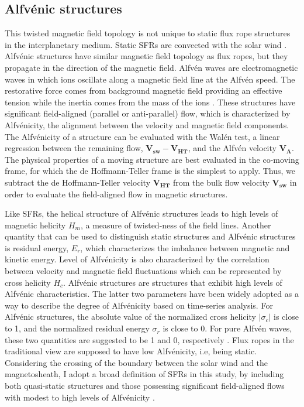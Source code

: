 \subsection{Alfv\'enic structures}
This twisted magnetic field topology is not unique to static flux rope structures in the interplanetary medium. Static SFRs are convected with the solar wind \citep{Cartwright:2008}. Alfv\'enic structures have similar magnetic field topology as flux ropes, but they propagate in the direction of the magnetic field. Alfv\'en waves are electromagnetic waves in which ions oscillate along a magnetic field line at the Alfv\'en speed. The restorative force comes from background magnetic field providing an effective tension while the inertia comes from the mass of the ions \citep{Alfven:1942}. These structures have significant field-aligned (parallel or anti-parallel) flow, which is characterized by Alfv\'enicity, the alignment between the velocity and magnetic field components. The Alfv\'enicity of a structure can be evaluated with the Wal\'en test, a linear regression between the remaining flow, $\mathbf{V_{sw}} - \mathbf{V_{HT}}$, and the Alfv\'en velocity $\mathbf{V_A}$. The physical properties of a moving structure are best evaluated in the co-moving frame, for which the de Hoffmann-Teller frame \citep{deHoffman-Teller:1950} is the simplest to apply. Thus, we subtract the de Hoffmann-Teller velocity $\mathbf{V_{HT}}$ from the bulk flow velocity $\mathbf{V_{sw}}$ in order to evaluate the field-aligned flow in magnetic structures.

Like SFRs, the helical structure of Alfv\'enic structures leads to high levels of magnetic helicity $H_m$\footnotemark{}, a measure of twisted-ness of the field lines. Another quantity that can be used to distinguish static structures and Alfv\'enic structures is residual energy, $E_r$\footnotemark[\value{footnote}], which characterizes the imbalance between magnetic and kinetic energy. Level of Alfv\'enicity is also characterized by the correlation between velocity and magnetic field fluctuations which can be represented by cross helicity $H_c$\footnotemark[\value{footnote}]. Alfv\'enic structures are structures that exhibit high levels of Alfv\'enic characteristics. The latter two parameters have been widely adopted as a way to describe the degree of Alfv\'enicity based on time-series analysis. For Alfv\'enic structures, the absolute value of the normalized cross helicity $|\sigma_c|$ is close to 1, and the normalized residual energy $\sigma_r$ is close to 0. For pure Alfv\'en waves, these two quantities are suggested to be 1 and 0, respectively \citep{Bruno:2013}. Flux ropes in the traditional view are supposed to have low Alfv\'enicity, i.e, being static. Considering the crossing of the boundary between the solar wind and the magnetosheath, I adopt a broad definition of SFRs in this study, by including both quasi-static structures and those possessing significant field-aligned flows with modest to high levels of Alfv\'enicity \citep{Chen:2022}.

